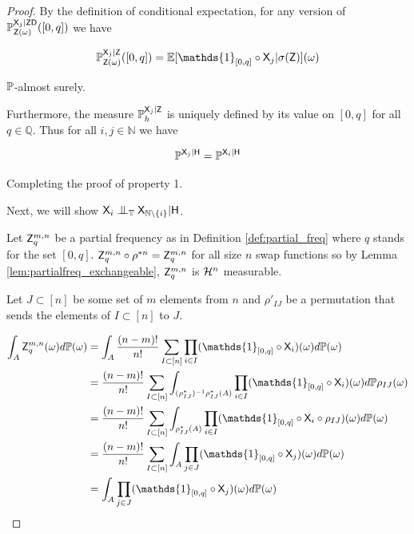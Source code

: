 \begin{proof}
By the definition of conditional expectation, for any version of $\mathbb{P}_{\mathsf{Z}(\omega)}^{\mathsf{X}_j|\mathsf{Z}\mathsf{D}}([0,q])$ we have

\begin{align}
    \prob{P}_{\RV{Z}(\omega)}^{\RV{X}_j|\RV{Z}}([0,q]) &= \mathbb{E}[\mathds{1}_{[0,q]}\circ \RV{X}_j|\sigma(\RV{Z})](\omega)\\
\end{align}

$\mathbb{P}$-almost surely.

Furthermore, the measure $\mathbb{P}_{h}^{\mathsf{X}_j|\mathsf{Z}}$ is uniquely defined by its value on $[0,q]$ for all $q\in \mathbb{Q}$. Thus for all $i,j\in \mathbb{N}$ we have

\begin{align}
    \mathbb{P}^{\mathsf{X}_j|\mathsf{H}} = \mathbb{P}^{\mathsf{X}_i|\mathsf{H}}
\end{align}

Completing the proof of property 1.

Next, we will show $\RV{X}_i\CI_\kernel{T} \RV{X}_{\mathbb{N}\setminus \{i\}} | \RV{H}$.

Let $\mathsf{Z}^{m,n}_q$ be a partial frequency as in Definition \ref{def:partial_freq} where $q$ stands for the set $[0,q]$. $\mathsf{Z}^{m,n}_q\circ \rho^{*n}=\mathsf{Z}^{m,n}_q$ for all size $n$ swap functions so by Lemma \ref{lem:partialfreq_exchangeable}, $\mathsf{Z}^{m,n}_q$  is $\mathcal{H}^n$ measurable.

Let $J\subset[n]$ be some set of $m$ elements from $n$ and $\rho'_{IJ}$ be a permutation that sends the elements of $I\subset[n]$ to $J$.

\begin{align}
    \int_{A} \RV{Z}_q^{m,n} (\omega) d\prob{P}(\omega) &= \int_{A} \frac{(n-m)!}{n!}\sum_{I\subset[n]}\prod_{i\in I} (\mathds{1}_{[0,q]}\circ \RV{X}_i)(\omega)d\prob{P}(\omega)\\
    &= \frac{(n-m)!}{n!}\sum_{I\subset[n]} \int_{(\rho^*_{IJ})^{-1}\rho^*_{IJ}(A)} \prod_{i\in I}(\mathds{1}_{[0,q]}\circ \RV{X}_i)(\omega)d\prob{P}\rho_{IJ}(\omega)\label{eq:permutation_invertible}\\
    &= \frac{(n-m)!}{n!}\sum_{I\subset[n]} \int_{\rho^*_{IJ}(A)} \prod_{i\in I}(\mathds{1}_{[0,q]}\circ \RV{X}_{i}\circ \rho_{IJ}) (\omega)d\prob{P}(\omega)\label{eq:using_pushforward}\\
    &= \frac{(n-m)!}{n!}\sum_{I\subset[n]} \int_{A} \prod_{j\in J}(\mathds{1}_{[0,q]}\circ \RV{X}_{j})(\omega)d\prob{P}(\omega)\label{eq:closure_under_permutation}\\
    &= \int_{A} \prod_{j\in J}(\mathds{1}_{[0,q]} \circ \RV{X}_j)(\omega)d\prob{P}(\omega) \label{eq:cond_expectation_first}
\end{align}


\end{proof}
